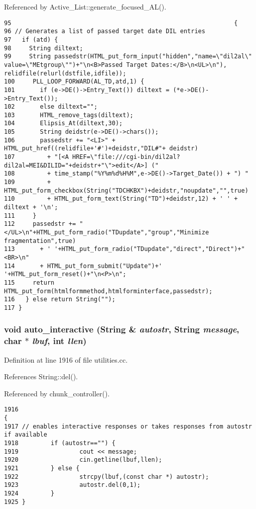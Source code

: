 Referenced by Active\_\-List::generate\_\-focused\_\-AL().



\footnotesize\begin{verbatim}95                                                              {
96 // Generates a list of passed target date DIL entries
97   if (atd) {
98     String diltext;
99     String passedstr(HTML_put_form_input("hidden","name=\"dil2al\" value=\"MEtgroup\"")+"\n<B>Passed Target Dates:</B>\n<UL>\n"), relidfile(relurl(dstfile,idfile));
100     PLL_LOOP_FORWARD(AL_TD,atd,1) {
101       if (e->DE()->Entry_Text()) diltext = (*e->DE()->Entry_Text());
102       else diltext="";
103       HTML_remove_tags(diltext);
104       Elipsis_At(diltext,30);
105       String deidstr(e->DE()->chars());
106       passedstr += "<LI>" + HTML_put_href((relidfile+'#')+deidstr,"DIL#"+ deidstr)
107         + "[<A HREF=\"file:///cgi-bin/dil2al?dil2al=MEI&DILID="+deidstr+"\">edit</A>] ("
108         + time_stamp("%Y%m%d%H%M",e->DE()->Target_Date()) + ") "
109         + HTML_put_form_checkbox(String("TDCHKBX")+deidstr,"noupdate","",true)
110         + HTML_put_form_text(String("TD")+deidstr,12) + ' ' + diltext + '\n';
111     }
112     passedstr += "</UL>\n"+HTML_put_form_radio("TDupdate","group","Minimize fragmentation",true)
113       + ' '+HTML_put_form_radio("TDupdate","direct","Direct")+"<BR>\n"
114       + HTML_put_form_submit("Update")+' '+HTML_put_form_reset()+"\n<P>\n";
115     return HTML_put_form(htmlformmethod,htmlforminterface,passedstr);
116   } else return String("");
117 }
\end{verbatim}\normalsize 
{}
\subsubsection{\setlength{\rightskip}{0pt plus 5cm}void auto\_\-interactive ({\bf String} \& {\em autostr}, {\bf String} {\em message}, char $\ast$ {\em lbuf}, int {\em llen})}\label{dil2al_8hh_a227}




Definition at line 1916 of file utilities.cc.

References String::del().

Referenced by chunk\_\-controller().



\footnotesize\begin{verbatim}1916                                                                                {
1917 // enables interactive responses or takes responses from autostr if available
1918         if (autostr=="") {
1919                 cout << message;
1920                 cin.getline(lbuf,llen);
1921         } else {
1922                 strcpy(lbuf,(const char *) autostr);
1923                 autostr.del(0,1);
1924         }
1925 }
\end{verbatim}\normalsize 
{}

